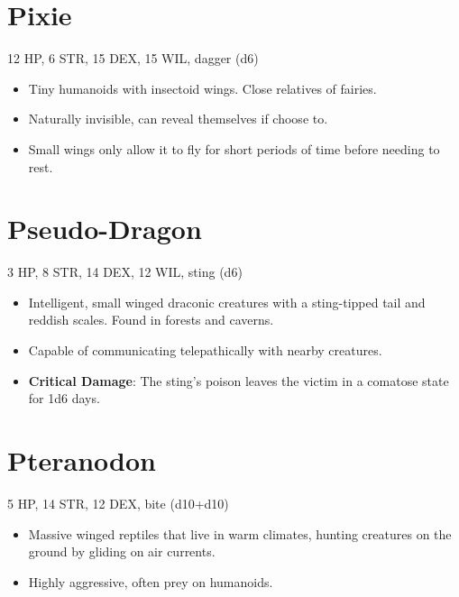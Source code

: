 \documentclass[
  10pt,
  american,
]{article}
\begin{document}
\hypertarget{pixie}{%
\section{Pixie}\label{pixie}}

12 HP, 6 STR, 15 DEX, 15 WIL, dagger (d6)

\begin{samepage}
\begin{itemize}
\setlength\itemsep{-.5em}
\item Tiny humanoids with insectoid wings. Close relatives of fairies.
\item Naturally invisible, can reveal themselves if choose to.
\item Small wings only allow it to fly for short periods of time before needing to rest.
\end{itemize}
\end{samepage}

\hypertarget{pseudo-dragon}{%
\section{Pseudo-Dragon}\label{pseudo-dragon}}

3 HP, 8 STR, 14 DEX, 12 WIL, sting (d6)

\begin{samepage}
\begin{itemize}
\setlength\itemsep{-.5em}
\item Intelligent, small winged draconic creatures with a sting-tipped tail and reddish scales. Found in forests and caverns.
\item Capable of communicating telepathically with nearby creatures.
\item \textbf{Critical Damage}: The sting's poison leaves the victim in a comatose state for 1d6 days.
\end{itemize}
\end{samepage}

\hypertarget{pteranodon}{%
\section{Pteranodon}\label{pteranodon}}

5 HP, 14 STR, 12 DEX, bite (d10+d10)

\begin{samepage}
\begin{itemize}
\setlength\itemsep{-.5em}
\item Massive winged reptiles that live in warm climates, hunting creatures on the ground by gliding on air currents.
\item Highly aggressive, often prey on humanoids.
\end{itemize}
\end{samepage}
\end{document}
